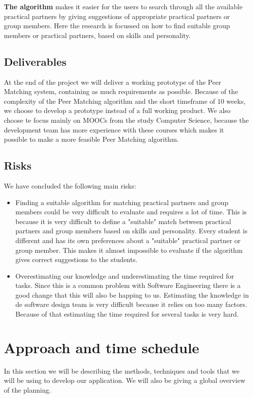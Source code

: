 \documentclass[]{article}
\begin{document}
\textbf{The algorithm} makes it easier for the users to search through all the available practical partners by giving suggestions of appropriate practical partners or group members.
Here the research is focussed on how to find suitable group members or practical partners, based on skills and personality.

\subsection{Deliverables}
At the end of the project we will deliver a working prototype of the Peer Matching system, containing as much requirements as possible.
Because of the complexity of the Peer Matching algorithm and the short timeframe of 10 weeks, we choose to develop a prototype instead of a full working product.
We also choose te focus mainly on MOOCs from the study Computer Science, because the development team has more experience with these courses which makes it possible to make a more feasible Peer Matching algorithm.

\subsection{Risks}
We have concluded the following main risks:

\begin{itemize}
\item Finding a suitable algorithm for matching practical partners and group members could be very difficult to evaluate and requires a lot of time.
This is because it is very difficult to define a "suitable" match between practical partners and group members based on skills and personality.
Every student is different and has its own preferences about a "suitable" practical partner or group member.
This makes it almost impossible to evaluate if the algorithm gives correct suggestions to the students.

\item Overestimating our knowledge and underestimating the time required for tasks.
Since this is a common problem with Software Engineering there is a good change that this will also be happing to us.
Estimating the knowledge in de software design team is very difficult because it relies on too many factors.
Because of that estimating the time required for several tasks is very hard.
\end{itemize}

\section{Approach and time schedule}
In this section we will be describing the methods, techniques and tools that we will be using to develop our application.
We will also be giving a global overview of the planning.
\end{document}
